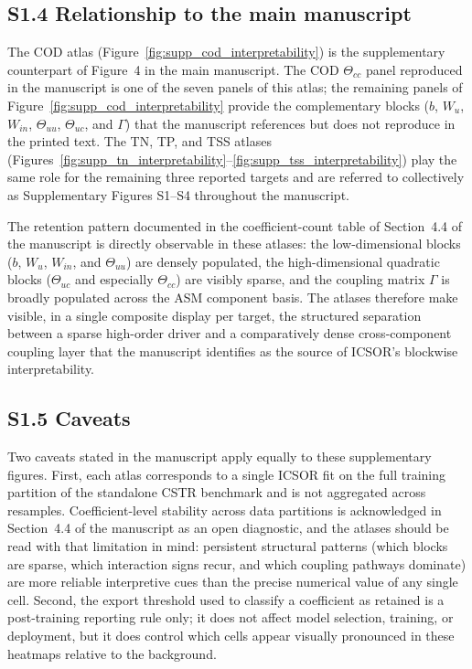 \documentclass[a4paper,11pt]{article}
\begin{document}
\subsection*{S1.4 Relationship to the main manuscript}

The COD atlas (Figure~\ref{fig:supp_cod_interpretability}) is the supplementary counterpart of Figure~4 in the main manuscript. The COD $\Theta_{cc}$ panel reproduced in the manuscript is one of the seven panels of this atlas; the remaining panels of Figure~\ref{fig:supp_cod_interpretability} provide the complementary blocks ($b$, $W_u$, $W_{in}$, $\Theta_{uu}$, $\Theta_{uc}$, and $\Gamma$) that the manuscript references but does not reproduce in the printed text. The TN, TP, and TSS atlases (Figures~\ref{fig:supp_tn_interpretability}--\ref{fig:supp_tss_interpretability}) play the same role for the remaining three reported targets and are referred to collectively as Supplementary Figures S1--S4 throughout the manuscript.

The retention pattern documented in the coefficient-count table of Section~4.4 of the manuscript is directly observable in these atlases: the low-dimensional blocks ($b$, $W_u$, $W_{in}$, and $\Theta_{uu}$) are densely populated, the high-dimensional quadratic blocks ($\Theta_{uc}$ and especially $\Theta_{cc}$) are visibly sparse, and the coupling matrix $\Gamma$ is broadly populated across the ASM component basis. The atlases therefore make visible, in a single composite display per target, the structured separation between a sparse high-order driver and a comparatively dense cross-component coupling layer that the manuscript identifies as the source of ICSOR's blockwise interpretability.

\subsection*{S1.5 Caveats}

Two caveats stated in the manuscript apply equally to these supplementary figures. First, each atlas corresponds to a single ICSOR fit on the full training partition of the standalone CSTR benchmark and is not aggregated across resamples. Coefficient-level stability across data partitions is acknowledged in Section~4.4 of the manuscript as an open diagnostic, and the atlases should be read with that limitation in mind: persistent structural patterns (which blocks are sparse, which interaction signs recur, and which coupling pathways dominate) are more reliable interpretive cues than the precise numerical value of any single cell. Second, the export threshold used to classify a coefficient as retained is a post-training reporting rule only; it does not affect model selection, training, or deployment, but it does control which cells appear visually pronounced in these heatmaps relative to the background.
\end{document}
